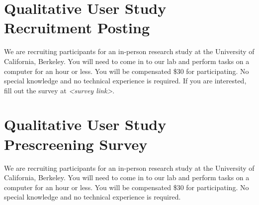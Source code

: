 \documentclass[USenglish,oneside,twocolumn]{article}
\begin{document}



\appendix

\section{Qualitative User Study Recruitment Posting} 
\label{qualitative-recruitment}
We are recruiting participants for an in-person research study at the University of California, Berkeley. You will need to come in to our lab and perform tasks on a computer for an hour or less. You will be compensated \$30 for participating. 
No special knowledge and no technical experience is required. If you are interested, fill out the survey at \textit{<survey link>}. 

\section{Qualitative User Study Prescreening Survey} 
\label{qualitative-prescreening}
We are recruiting participants for an in-person research study at the University of California, Berkeley. You will need to come in to our lab and perform tasks on a computer for an hour or less. You will be compensated \$30 for participating. No special knowledge and no technical experience is required.\\
\end{document}
